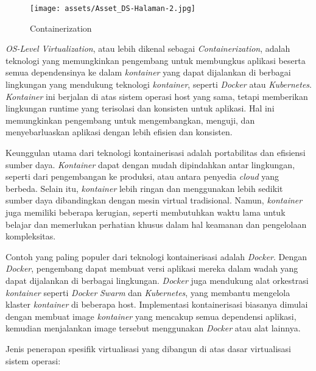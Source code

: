 \documentclass[12pt]{article}
\begin{document}
\begin{enumerate}
    \begin{figure}[h!]
        \centering 
        \texttt{[image: assets/Asset\_DS-Halaman-2.jpg]}
        \caption{Containerization}
    \end{figure}
    
    \par \textit{OS-Level Virtualization}, atau lebih dikenal sebagai \textit{Containerization}, adalah teknologi yang memungkinkan pengembang untuk membungkus aplikasi beserta semua dependensinya ke dalam \textit{kontainer} yang dapat dijalankan di berbagai lingkungan yang mendukung teknologi \textit{kontainer}, seperti \textit{Docker} atau \textit{Kubernetes}. \textit{Kontainer} ini berjalan di atas sistem operasi host yang sama, tetapi memberikan lingkungan runtime yang terisolasi dan konsisten untuk aplikasi. Hal ini memungkinkan pengembang untuk mengembangkan, menguji, dan menyebarluaskan aplikasi dengan lebih efisien dan konsisten.

    \par Keunggulan utama dari teknologi kontainerisasi adalah portabilitas dan efisiensi sumber daya. \textit{Kontainer} dapat dengan mudah dipindahkan antar lingkungan, seperti dari pengembangan ke produksi, atau antara penyedia \textit{cloud} yang berbeda. Selain itu, \textit{kontainer} lebih ringan dan menggunakan lebih sedikit sumber daya dibandingkan dengan mesin virtual tradisional. Namun, \textit{kontainer} juga memiliki beberapa kerugian, seperti membutuhkan waktu lama untuk belajar dan memerlukan perhatian khusus dalam hal keamanan dan pengelolaan kompleksitas.
    
    \par Contoh yang paling populer dari teknologi kontainerisasi adalah \textit{Docker}. Dengan \textit{Docker}, pengembang dapat membuat versi aplikasi mereka dalam wadah yang dapat dijalankan di berbagai lingkungan. \textit{Docker} juga mendukung alat orkestrasi \textit{kontainer} seperti \textit{Docker} \textit{Swarm} dan \textit{Kubernetes}, yang membantu mengelola klaster \textit{kontainer} di beberapa host. Implementasi kontainerisasi biasanya dimulai dengan membuat image \textit{kontainer} yang mencakup semua dependensi aplikasi, kemudian menjalankan image tersebut menggunakan \textit{Docker} atau alat lainnya.
\end{enumerate}

\par Jenis penerapan spesifik virtualisasi yang dibangun di atas dasar virtualisasi sistem operasi:
\end{document}

